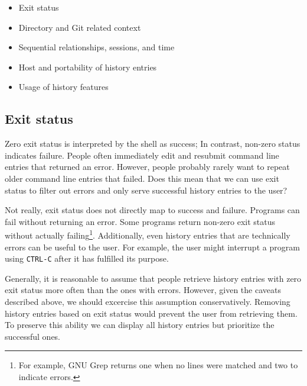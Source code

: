 \begin{itemize}
    \item Exit status
    \item Directory and Git related context
    \item Sequential relationships, sessions, and time
    \item Host and portability of history entries
    \item Usage of history features
\end{itemize}

\subsection{Exit status}

Zero exit status is interpreted by the shell as success; In contrast, non-zero status indicates failure.\cite{bashman} People often immediately edit and resubmit command line entries that returned an error. However, people probably rarely want to repeat older command line entries that failed. Does this mean that we can use exit status to filter out errors and only serve successful history entries to the user?

Not really, exit status does not directly map to success and failure. Programs can fail without returning an error. Some programs return non-zero exit status without actually failing\footnote{For example, GNU Grep returns one when no lines were matched and two to indicate errors.\cite{man-grep}}. 
Additionally, even history entries that are technically errors can be useful to the user. For example, the user might interrupt a program using \verb|CTRL-C| after it has fulfilled its purpose.

Generally, it is reasonable to assume that people retrieve history entries with zero exit status more often than the ones with errors. However, given the caveats described above, we should excercise this assumption conservatively. Removing history entries based on exit status would prevent the user from retrieving them. To preserve this ability we can display all history entries but prioritize the successful ones.


 
